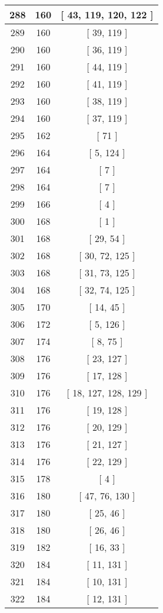 \begin{center}
\begin{longtable}[H]{|| c c c ||}
\hline
288 & 160 & [ 43, 119, 120, 122 ] \\ 
\hline
289 & 160 & [ 39, 119 ] \\ 
\hline
290 & 160 & [ 36, 119 ] \\ 
\hline
291 & 160 & [ 44, 119 ] \\ 
\hline
292 & 160 & [ 41, 119 ] \\ 
\hline
293 & 160 & [ 38, 119 ] \\ 
\hline
294 & 160 & [ 37, 119 ] \\ 
\hline
295 & 162 & [ 71 ] \\ 
\hline
296 & 164 & [ 5, 124 ] \\ 
\hline
297 & 164 & [ 7 ] \\ 
\hline
298 & 164 & [ 7 ] \\ 
\hline
299 & 166 & [ 4 ] \\ 
\hline
300 & 168 & [ 1 ] \\ 
\hline
301 & 168 & [ 29, 54 ] \\ 
\hline
302 & 168 & [ 30, 72, 125 ] \\ 
\hline
303 & 168 & [ 31, 73, 125 ] \\ 
\hline
304 & 168 & [ 32, 74, 125 ] \\ 
\hline
305 & 170 & [ 14, 45 ] \\ 
\hline
306 & 172 & [ 5, 126 ] \\ 
\hline
307 & 174 & [ 8, 75 ] \\ 
\hline
308 & 176 & [ 23, 127 ] \\ 
\hline
309 & 176 & [ 17, 128 ] \\ 
\hline
310 & 176 & [ 18, 127, 128, 129 ] \\ 
\hline
311 & 176 & [ 19, 128 ] \\ 
\hline
312 & 176 & [ 20, 129 ] \\ 
\hline
313 & 176 & [ 21, 127 ] \\ 
\hline
314 & 176 & [ 22, 129 ] \\ 
\hline
315 & 178 & [ 4 ] \\ 
\hline
316 & 180 & [ 47, 76, 130 ] \\ 
\hline
317 & 180 & [ 25, 46 ] \\ 
\hline
318 & 180 & [ 26, 46 ] \\ 
\hline
319 & 182 & [ 16, 33 ] \\ 
\hline
320 & 184 & [ 11, 131 ] \\ 
\hline
321 & 184 & [ 10, 131 ] \\ 
\hline
322 & 184 & [ 12, 131 ] \\ 

\end{longtable}
\end{center}
